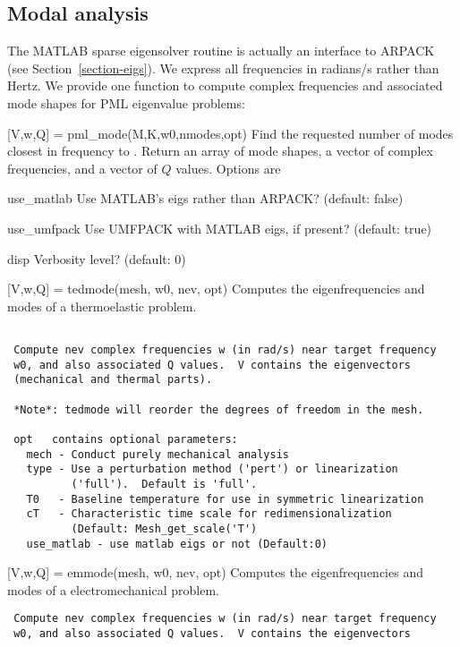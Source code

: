 \clearpage
\subsection{Modal analysis}
The MATLAB sparse eigensolver routine  is actually an
interface to ARPACK (see Section~\ref{section-eigs}).  We express all
frequencies in radians/s rather than Hertz.  We provide one function
to compute complex frequencies and associated mode shapes for PML
eigenvalue problems:
\begin{codelist}

  \item[{[V,w,Q]} = pml\_mode(M,K,w0,nmodes,opt)]
    Find the requested number of modes closest in frequency to
    .  Return an array of mode shapes, a vector of complex
    frequencies, and a vector of $Q$ values.  Options are 
    \begin{codelist}
      \item[use\_matlab]  Use MATLAB's eigs rather than ARPACK?
      (default: false)
      \item[use\_umfpack]  Use UMFPACK with MATLAB eigs, if present?
      (default: true)
      \item[disp]  Verbosity level? (default: 0)
    \end{codelist}

   \item[{[V,w,Q]} = tedmode(mesh, w0, nev, opt)]
   Computes the eigenfrequencies and modes of a thermoelastic problem.
\begin{verbatim}

 Compute nev complex frequencies w (in rad/s) near target frequency
 w0, and also associated Q values.  V contains the eigenvectors
 (mechanical and thermal parts).

 *Note*: tedmode will reorder the degrees of freedom in the mesh.

 opt   contains optional parameters:
   mech - Conduct purely mechanical analysis
   type - Use a perturbation method ('pert') or linearization
          ('full').  Default is 'full'.
   T0   - Baseline temperature for use in symmetric linearization
   cT   - Characteristic time scale for redimensionalization
          (Default: Mesh_get_scale('T')
   use_matlab - use matlab eigs or not (Default:0)
\end{verbatim}

   \item[{[V,w,Q]} = emmode(mesh, w0, nev, opt)]
   Computes the eigenfrequencies and modes of a electromechanical problem.
\begin{verbatim}
 Compute nev complex frequencies w (in rad/s) near target frequency
 w0, and also associated Q values.  V contains the eigenvectors



\end{verbatim}
\end{codelist}
